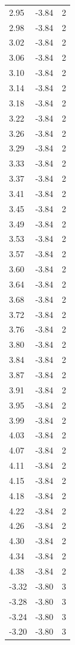 \begin{longtable}{lrr}
  2.95 & -3.84 & 2 \\
  2.98 & -3.84 & 2 \\
  3.02 & -3.84 & 2 \\
  3.06 & -3.84 & 2 \\
  3.10 & -3.84 & 2 \\
  3.14 & -3.84 & 2 \\
  3.18 & -3.84 & 2 \\
  3.22 & -3.84 & 2 \\
  3.26 & -3.84 & 2 \\
  3.29 & -3.84 & 2 \\
  3.33 & -3.84 & 2 \\
  3.37 & -3.84 & 2 \\
  3.41 & -3.84 & 2 \\
  3.45 & -3.84 & 2 \\
  3.49 & -3.84 & 2 \\
  3.53 & -3.84 & 2 \\
  3.57 & -3.84 & 2 \\
  3.60 & -3.84 & 2 \\
  3.64 & -3.84 & 2 \\
  3.68 & -3.84 & 2 \\
  3.72 & -3.84 & 2 \\
  3.76 & -3.84 & 2 \\
  3.80 & -3.84 & 2 \\
  3.84 & -3.84 & 2 \\
  3.87 & -3.84 & 2 \\
  3.91 & -3.84 & 2 \\
  3.95 & -3.84 & 2 \\
  3.99 & -3.84 & 2 \\
  4.03 & -3.84 & 2 \\
  4.07 & -3.84 & 2 \\
  4.11 & -3.84 & 2 \\
  4.15 & -3.84 & 2 \\
  4.18 & -3.84 & 2 \\
  4.22 & -3.84 & 2 \\
  4.26 & -3.84 & 2 \\
  4.30 & -3.84 & 2 \\
  4.34 & -3.84 & 2 \\
  4.38 & -3.84 & 2 \\
  -3.32 & -3.80 & 3 \\
  -3.28 & -3.80 & 3 \\
  -3.24 & -3.80 & 3 \\
  -3.20 & -3.80 & 3 \\

\end{longtable}
